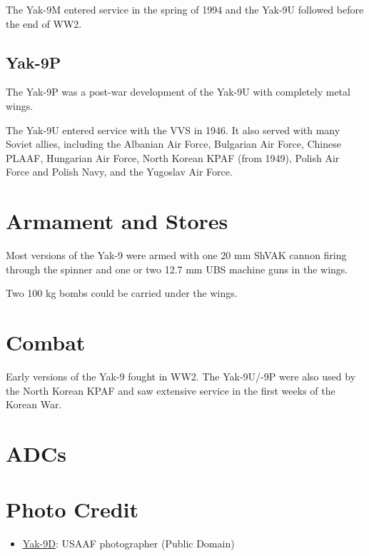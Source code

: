 The Yak-9M entered service in the spring of 1994 and the Yak-9U followed before the end of WW2.

\subsection{Yak-9P}

The Yak-9P was a post-war development of the Yak-9U with completely metal wings.

The Yak-9U entered service with the VVS in 1946. It also served with many Soviet allies, including the Albanian Air Force, Bulgarian Air Force, Chinese PLAAF, Hungarian Air Force, North Korean KPAF (from 1949), Polish Air Force and Polish Navy, and the Yugoslav Air Force.

\section{Armament and Stores}

Most versions of the Yak-9 were armed with one 20 mm ShVAK cannon firing through the spinner and one or two 12.7 mm UBS machine guns in the wings.

Two 100 kg bombs could be carried under the wings.

\section{Combat}

Early versions of the Yak-9 fought in WW2. The Yak-9U/-9P were also used by the North Korean KPAF and saw extensive service in the first weeks of the Korean War.

\section{ADCs}

\begin{adclist}
\end{adclist}

\section{Photo Credit}
\begin{itemize}\raggedright
    \item \href{https://commons.wikimedia.org/wiki/File:Yak-9Ds_at_Poltava,_Operation_Frantic.jpg}{Yak-9D}: USAAF photographer (Public Domain)
\end{itemize}